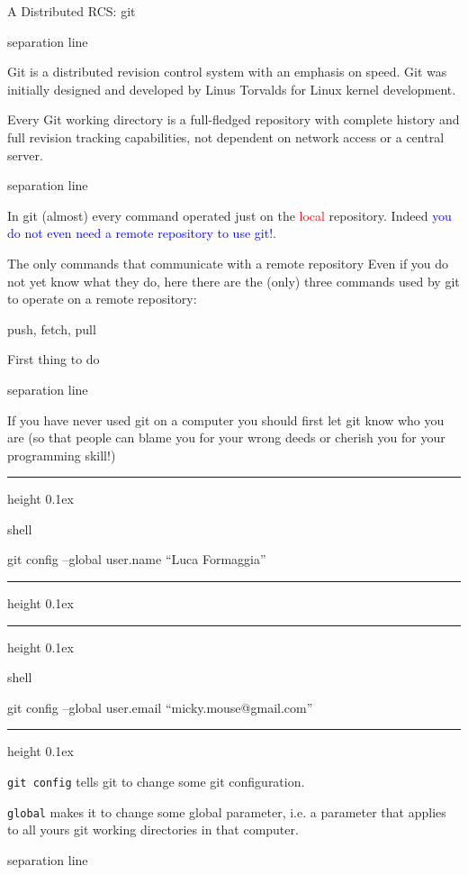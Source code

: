 \documentclass{beamer}
\newenvironment{shell}{%
\footnotesize\flushleft\hrule height 0.1ex
\tt\begin{beamercolorbox}[sep=1ex,left]{shell}%
}{%
\end{beamercolorbox}
\hrule height 0.1ex
\endflushleft\par
}
\newcommand{\titleline}[1][0.025cm]{%
\begin{beamercolorbox}[wd=\paperwidth,ht=#1,center]{separation line}%
\end{beamercolorbox}%
}
\begin{document}
\begin{frame}{A Distributed RCS: git}
\titleline
{%
\small
\RaggedRight
Git is a distributed revision control system with an emphasis on speed.
Git was initially designed and developed by Linus Torvalds for Linux kernel
development. 

\alert{Every Git working directory is a full-fledged repository
with complete history and full revision tracking capabilities, not dependent on
network access or a central server.}
}%
\titleline

In git (almost) every command operated just on the  \textcolor{red}{local}
repository. Indeed \textcolor{blue}{you do not even need a remote repository to use git!}.
\end{frame}
\begin{frame}{The only commands that communicate with a remote repository}
Even if you do not yet know what they do, here there are the (only) three commands used by git to operate on a remote repository:
\medskip

\begin{center}
\alert{push, fetch, pull}
\end{center}
\end{frame}

\begin{frame}{First thing to do}
\titleline
If you have never used git on a computer you should first let git know who you are (so that people can blame you for your wrong deeds or cherish you for your programming skill!)

\begin{shell}
git config --global user.name ``Luca Formaggia''
\end{shell}
\begin{shell}
git config --global user.email ``micky.mouse@gmail.com''
\end{shell}

\texttt{git config} tells git to change some git configuration. 

\texttt{global} makes it to change some global parameter,
i.e. a parameter that applies to all yours git working directories in
that computer.  \titleline
\end{frame}
\end{document}
